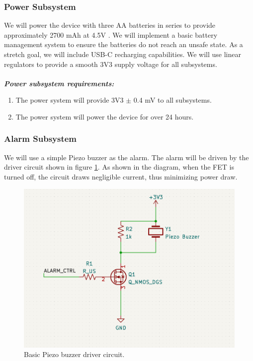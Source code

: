 \documentclass{article}
\begin{document}
\subsubsection{Power Subsystem} 

We will power the device with three AA batteries in series to provide approximately 2700 mAh at 4.5V \cite{battery}. We will implement a basic battery management system to ensure the batteries do not reach an unsafe state. As a stretch goal, we will include USB-C recharging capabilities. We will use linear regulators to provide a smooth 3V3 supply voltage for all subsystems. 
\paragraph{} 

\textit{\textbf{Power subsystem requirements:}}

\begin{enumerate}
	\item The power system will provide 3V3 $\pm$ 0.4 mV to all subsystems. 
	\item The power system will power the device for over 24 hours. 
\end{enumerate}

\subsubsection{Alarm Subsystem} 

We will use a simple Piezo buzzer as the alarm. The alarm will be driven by the driver circuit shown in figure \ref{buzzer}. As shown in the diagram, when the FET is turned off, the circuit draws negligible current, thus minimizing power draw. 



\begin{center}
	\begin{figure}[H]
		\centering
		\includegraphics[width=0.25 \textwidth]{buzzer_ckt.png}
		\caption{Basic Piezo buzzer driver circuit.} \label{buzzer}
	\end{figure}
\end{center}


\paragraph{} 
\end{document}
